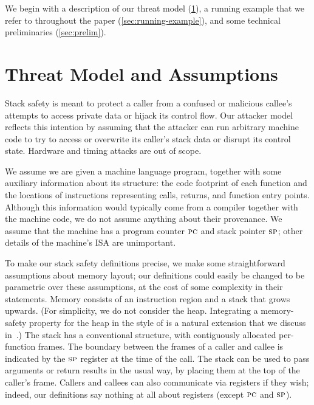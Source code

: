 \documentclass[acmsmall,review,anonymous]{acmart}\settopmatter{printfolios=true,printccs=false,printacmref=false}
\begin{document}
We begin with a description of our threat model
(\cref{sec:threat}), a running example that we refer to throughout the paper
(\cref{sec:running-example}),  and some technical preliminaries
(\cref{sec:prelim}).

\section{Threat Model and Assumptions}
\label{sec:threat}

Stack safety is meant to protect a caller from a confused or malicious callee's
attempts to access private data or hijack its control flow. Our
attacker model reflects this intention by assuming that the attacker
can run arbitrary machine code to try to access or overwrite its caller's stack data
or disrupt its control state.  Hardware and timing attacks are out of
scope.

\newcommand*{\rsp}{\textsc{sp}}

We assume we are given a machine language program, together with some auxiliary information
about its structure: the code footprint of each function and the locations of instructions
representing calls, returns, and function entry points.
Although this information would typically come from a compiler together with
the machine code, we do not
assume anything about their provenance.  We assume that the machine has a
program counter $\textsc{pc}$
and stack pointer $\rsp$; other details of the machine's ISA are unimportant.

To make our stack safety definitions precise, we make some straightforward
assumptions about
memory layout; our definitions could easily be changed to be parametric over
these assumptions, at the cost of some complexity in their statements.  Memory
consists of an instruction region and a stack that grows upwards. (For simplicity,
we do not consider the heap. Integrating a memory-safety property for the
heap in the style of
\citet{DBLP:conf/post/AmorimHP18} is a natural extension that we discuss
in~.)  The stack has a conventional structure, with
contiguously allocated per-function frames.
The boundary between the frames of a caller and callee is indicated by the $\rsp$ register
at the time of the call.  The stack can be used to
pass arguments or return results in the usual way, by placing them
at the top of the caller's frame. Callers and callees can also communicate
via registers if they wish; indeed, our
definitions say nothing at all about registers (except $\textsc{pc}$ and
$\rsp$). \ifaftersubmission{}\fi
\end{document}
